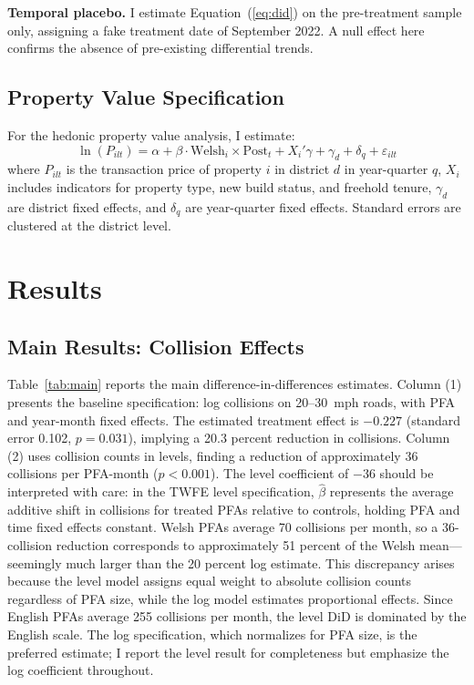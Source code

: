 \documentclass[12pt]{article}
\begin{document}
\textbf{Temporal placebo.} I estimate Equation~(\ref{eq:did}) on the pre-treatment sample only, assigning a fake treatment date of September 2022. A null effect here confirms the absence of pre-existing differential trends.

\subsection{Property Value Specification}

For the hedonic property value analysis, I estimate:
\begin{equation}
\label{eq:hedonic}
\ln(P_{ilt}) = \alpha + \beta \cdot \text{Welsh}_i \times \text{Post}_t + X_i'\gamma + \gamma_d + \delta_q + \varepsilon_{ilt}
\end{equation}
where $P_{ilt}$ is the transaction price of property $i$ in district $d$ in year-quarter $q$, $X_i$ includes indicators for property type, new build status, and freehold tenure, $\gamma_d$ are district fixed effects, and $\delta_q$ are year-quarter fixed effects. Standard errors are clustered at the district level.


\section{Results}
\label{sec:results}

\subsection{Main Results: Collision Effects}



Table~\ref{tab:main} reports the main difference-in-differences estimates. Column (1) presents the baseline specification: log collisions on 20--30~mph roads, with PFA and year-month fixed effects. The estimated treatment effect is $-0.227$ (standard error 0.102, $p = 0.031$), implying a 20.3 percent reduction in collisions. Column (2) uses collision counts in levels, finding a reduction of approximately 36 collisions per PFA-month ($p < 0.001$). The level coefficient of $-36$ should be interpreted with care: in the TWFE level specification, $\hat{\beta}$ represents the average additive shift in collisions for treated PFAs relative to controls, holding PFA and time fixed effects constant. Welsh PFAs average 70 collisions per month, so a 36-collision reduction corresponds to approximately 51 percent of the Welsh mean---seemingly much larger than the 20 percent log estimate. This discrepancy arises because the level model assigns equal weight to absolute collision counts regardless of PFA size, while the log model estimates proportional effects. Since English PFAs average 255 collisions per month, the level DiD is dominated by the English scale. The log specification, which normalizes for PFA size, is the preferred estimate; I report the level result for completeness but emphasize the log coefficient throughout.
\end{document}
